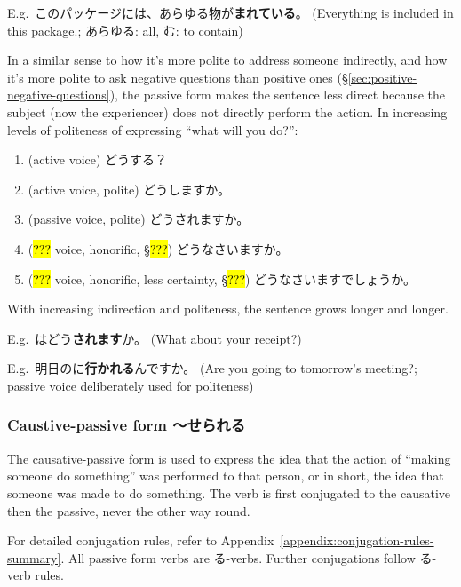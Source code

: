 \documentclass[../nihongo-gakushuu-kyouzai.tex]{subfiles}
\begin{document}
E.g.\ このパッケージには、あらゆる物が\textbf{まれている}。 (Everything is included in this package.; あらゆる: all, む: to contain)

In a similar sense to how it's more polite to address someone indirectly, and how it's more polite to ask negative questions than positive ones (\S\ref{sec:positive-negative-questions}), the passive form makes the sentence less direct because the subject (now the experiencer) does not directly perform the action. In increasing levels of politeness of expressing ``what will you do?'':
\begin{enumerate}[label=\arabic*.]
    \item (active voice) どうする？
    \item (active voice, polite) どうしますか。
    \item (passive voice, polite) どうされますか。
    \item (\hl{???} voice, honorific, \S\hl{???}) どうなさいますか。
    \item (\hl{???} voice, honorific, less certainty, \S\hl{???}) どうなさいますでしょうか。
\end{enumerate}
With increasing indirection and politeness, the sentence grows longer and longer.

E.g.\ はどう\textbf{されます}か。 (What about your receipt?)

E.g.\ 明日のに\textbf{行かれる}んですか。 (Are you going to tomorrow's meeting?; passive voice deliberately used for politeness)

\subsubsection{Caustive-passive form 〜せられる} \label{sec:causative-passive-form}

The causative-passive form is used to express the idea that the action of ``making someone do something'' was performed to that person, or in short, the idea that someone was made to do something. The verb is first conjugated to the causative then the passive, never the other way round.

For detailed conjugation rules, refer to Appendix~\ref{appendix:conjugation-rules-summary}. All passive form verbs are る-verbs. Further conjugations follow る-verb rules.
\end{document}
